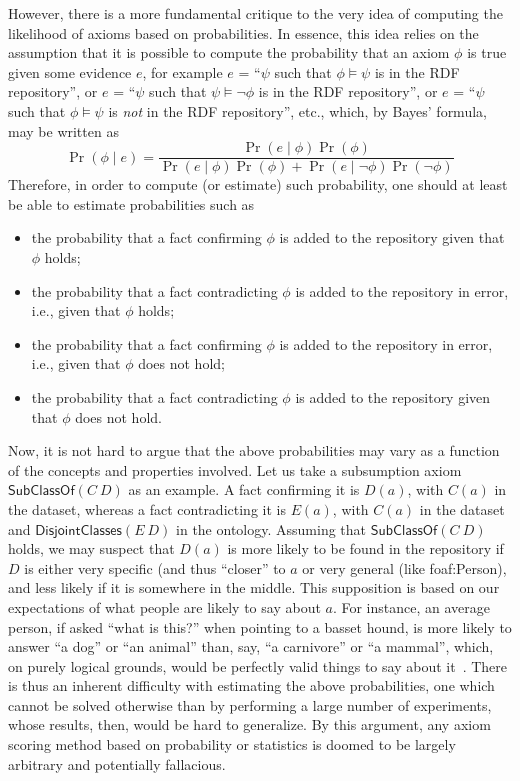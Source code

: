 \documentclass{llncs}
\begin{document}
However, there is a more fundamental critique to the very idea of computing the likelihood
of axioms based on probabilities. In essence, this idea relies on the assumption
that it is possible to compute the probability that an axiom $\phi$ is true given
some evidence $e$, for example $e$ = ``$\psi$ such that $\phi\models\psi$ is in the RDF repository'',
or $e$ = ``$\psi$ such that $\psi\models\neg\phi$ is in the RDF repository'',
or $e$ = ``$\psi$ such that $\phi\models\psi$ is \emph{not} in the RDF repository'', etc.,
which, by Bayes' formula, may be written as
\begin{equation}
  \Pr(\phi \mid e) =
    \frac{\Pr(e \mid \phi)\Pr(\phi)}{\Pr(e \mid \phi)\Pr(\phi) + \Pr(e \mid \neg\phi)\Pr(\neg\phi)}
\end{equation}
Therefore, in order to compute (or estimate) such probability,
one should at least be able to estimate probabilities such as
\begin{itemize}
\item the probability that a fact confirming $\phi$ is added to the repository
  given that $\phi$ holds;
\item the probability that a fact contradicting $\phi$ is added to the repository
  in error, i.e., given that $\phi$ holds;
\item the probability that a fact confirming $\phi$ is added to the repository
  in error, i.e., given that $\phi$ does not hold;
\item the probability that a fact contradicting $\phi$ is added to the repository
  given that $\phi$ does not hold.
\end{itemize}
Now, it is not hard to argue that the above probabilities may vary as a function of the
concepts and properties involved. Let us take a subsumption axiom $\mathsf{SubClassOf}(C\ D)$
as an example. A fact confirming it is $D(a)$, with $C(a)$ in the dataset,
whereas a fact contradicting it is $E(a)$, with $C(a)$ in the dataset
and $\mathsf{DisjointClasses}(E\ D)$ in the ontology.
Assuming that $\mathsf{SubClassOf}(C\ D)$ holds, we may suspect that
$D(a)$ is more likely to be found in the repository
if $D$ is either very specific (and thus ``closer'' to $a$ or very general (like
\textsf{foaf:Person}), and less likely if it is somewhere in the middle.
This supposition is based on our expectations of what people are likely to say
about $a$. For instance, an average person, if asked ``what is this?'' when pointing
to a basset hound, is more likely to answer ``a dog'' or ``an animal'' than,
say, ``a carnivore'' or ``a mammal'', which, on purely logical grounds,
would be perfectly valid things to say about it~\cite{Lakoff1987}.
There is thus an inherent difficulty with estimating the above probabilities,
one which cannot be solved otherwise than by performing a large number of
experiments, whose results, then, would be hard to generalize.
By this argument, any axiom scoring method based on probability or statistics is doomed
to be largely arbitrary and potentially fallacious.
\end{document}
